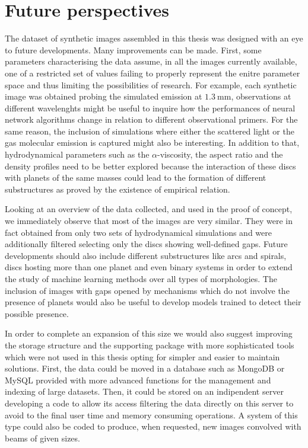 \documentclass[a4paper,10pt]{report}
\begin{document}
\section{Future perspectives}

The dataset of synthetic images assembled in this thesis was designed with an 
eye to future developments. Many improvements can be made. First, some parameters characterising the data
assume, in all the images currently available, one of a restricted set of values failing to properly represent 
the enitre parameter space and thus limiting the possibilities of research.
For example, each synthetic image was obtained probing the simulated emission at $\SI{1.3}{\mm}$,
observations at different wavelenghts might be useful to inquire how the
performances of neural network algorithms change in relation to different observational primers.
For the same reason, the inclusion of simulations where either the scattered light or the gas molecular
emission is captured might also be interesting. In addition to that, hydrodynamical parameters such as 
the $\alpha$-viscosity, the aspect ratio and the density profiles need to be better explored 
because the interaction of these discs with planets of the same masses
could lead to the formation of different substructures as proved by the existence of \citet{kanagawa}
empirical relation.

Looking at an overview of the data collected, and used in the proof of concept, we immediately observe that
most of the images are very similar. They were in fact obtained from only two sets of hydrodynamical simulations
and were additionally filtered selecting only the discs showing well-defined gaps. 
Future developments should also include different substructures like arcs and spirals, discs 
hosting more than one planet and even binary systems in order to extend the study of machine learning methods
over all types of morphologies. The inclusion of images with gaps opened by mechanisms which do not involve the presence of
planets would also be useful to develop models trained to detect their possible presence.

In order to complete an expansion of this size we would also suggest improving the storage structure
and the supporting package with more sophisticated tools which were not used in this thesis opting for
simpler and easier to maintain solutions. First, the data could be moved in a database such as MongoDB or MySQL
provided with more advanced functions for the management and indexing of large datasets.
Then, it could be stored on an indipendent server developing a code to allow its access filtering the data directly on 
this server to avoid to the final user time and memory consuming operations. A system of this type could also be coded to
produce, when requested, new images convolved with beams of given sizes.
\end{document}
